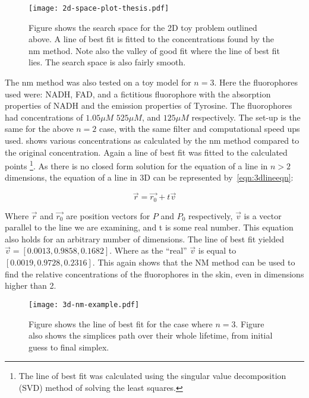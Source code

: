 \begin{figure}[!htpb]
  \centering
  \texttt{[image: 2d-space-plot-thesis.pdf]}
  \caption{Figure shows the search space for the 2D toy problem outlined above. A line of best fit is fitted to the concentrations found by the \gls*{nm} method. Note also the valley of good fit where the line of best fit lies. The search space is also fairly smooth.}
  \label{fig:spaceplot2D}
\end{figure}


The \gls*{nm} method was also tested on a toy model for $n=3$.
Here the fluorophores used were: NADH, FAD, and a fictitious fluorophore with the absorption properties of NADH and the emission properties of Tyrosine.
The fluorophores had concentrations of $1.05\mu M$ $525\mu M$, and $125\mu M$ respectively.
The set-up is the same for the above $n=2$ case, with the same filter and computational speed ups used.
 shows various concentrations as calculated by the \gls*{nm} method compared to the original concentration.
Again a line of best fit was fitted to the calculated points \footnote{The line of best fit was calculated using the singular value decomposition (SVD) method of solving the least squares.}.
As there is no closed form solution for the equation of a line in $n>2$ dimensions, the equation of a line in 3D can be represented by~\cref{eqn:3dlineeqn}:

\begin{equation}
\overrightarrow{r}=\overrightarrow{r_0}+t\overrightarrow{v}
\label{eqn:3dlineeqn}
\end{equation}

Where $\overrightarrow{r}$ and $\overrightarrow{r_0}$ are position vectors for $P$ and $P_0$ respectively, $\overrightarrow{v}$ is a vector parallel to the line we are examining, and t is some real number.
This equation also holds for an arbitrary number of dimensions.
The line of best fit yielded $\overrightarrow{v} =\left[0.0013, 0.9858, 0.1682\right]$.
Where as the ``real'' $\overrightarrow{v}$ is equal to $\left[0.0019, 0.9728, 0.2316\right]$.
This again shows that the NM method can be used to find the relative concentrations of the fluorophores in the skin, even in dimensions higher than 2.

\begin{figure}[!htpb]
  \centering
  \texttt{[image: 3d-nm-example.pdf]}
  \caption{Figure shows the line of best fit for the case where $n=3$. Figure also shows the simplices path over their whole lifetime, from initial guess to final simplex.}
  \label{fig:3dtoymodel}
\end{figure}

